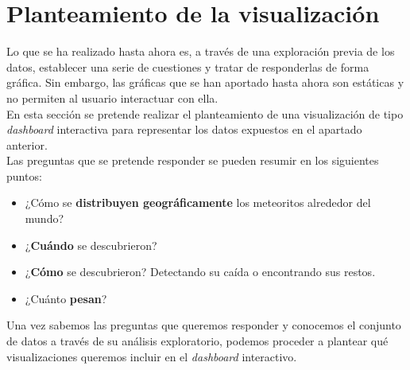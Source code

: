 \documentclass[12pt]{article}
\begin{document}
    \section{Planteamiento de la visualización}
    Lo que se ha realizado hasta ahora es, a través de una exploración previa de los datos, establecer una serie de cuestiones y tratar de responderlas de forma gráfica. Sin embargo, las gráficas que se han aportado hasta ahora son estáticas y no permiten al usuario interactuar con ella.\\
    En esta sección se pretende realizar el planteamiento de una visualización de tipo \textit{dashboard} interactiva para representar los datos expuestos en el apartado anterior.\\
    Las preguntas que se pretende responder se pueden resumir en los siguientes puntos:
    \begin{itemize}
    	\item ¿Cómo se \textbf{distribuyen geográficamente} los meteoritos alrededor del mundo?
    	\item ¿\textbf{Cuándo} se descubrieron? 
    	\item ¿\textbf{Cómo} se descubrieron? Detectando su caída o encontrando sus restos.
    	\item ¿Cuánto \textbf{pesan}?
    \end{itemize}
	Una vez sabemos las preguntas que queremos responder y conocemos el conjunto de datos a través de su análisis exploratorio, podemos proceder a plantear qué visualizaciones queremos incluir en el \textit{dashboard} interactivo.
\end{document}
